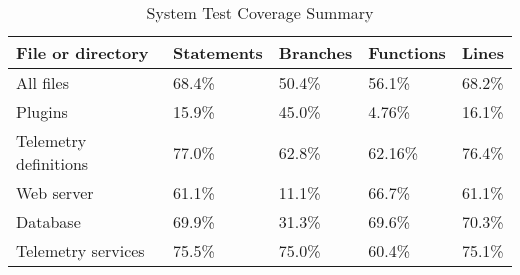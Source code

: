 \begin{table}[ht]
\centering
\caption{System Test Coverage Summary}
\label{tab:tests}
\begin{tabular}{|l|l|l|l|l|}
\hline
\rowcolor[HTML]{C0C0C0} 
File or directory     & Statements & Branches & Functions & Lines  \\ \hline
All files             & 68.4\%     & 50.4\%   & 56.1\%    & 68.2\% \\ \hline
Plugins               & 15.9\%     & 45.0\%   & 4.76\%    & 16.1\% \\ \hline
Telemetry definitions & 77.0\%     & 62.8\%   & 62.16\%   & 76.4\% \\ \hline
Web server            & 61.1\%     & 11.1\%   & 66.7\%    & 61.1\% \\ \hline
Database              & 69.9\%     & 31.3\%   & 69.6\%    & 70.3\% \\ \hline
Telemetry services    & 75.5\%     & 75.0\%   & 60.4\%    & 75.1\% \\ \hline
\end{tabular}
\end{table}

